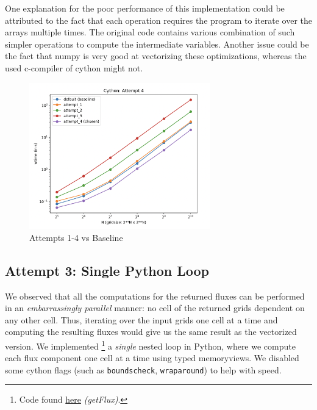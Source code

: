 \documentclass[a4paper,10pt]{article}
\begin{document}
One explanation for the poor performance of this implementation could be attributed to the fact that each operation requires the program to iterate over the arrays multiple times.
The original code contains various combination of such simpler operations to compute the intermediate variables.
Another issue could be the fact that numpy is very good at vectorizing these optimizations, whereas the used c-compiler of cython might not.
\begin{figure}[h]
  \centering
  \includegraphics[width=0.7\textwidth]{images/cython/cython_attempt_4.png}
  \caption{Attempts 1-4 vs Baseline}
  \label{fig:cython_attempts}
\end{figure}

    

\subsection{Attempt 3: Single \textbf{Python} Loop}
We observed that all the computations for the returned fluxes can be performed in an \textit{embarrassingly parallel} manner: no cell of the returned grids dependent on any other cell.
Thus, iterating over the input grids one cell at a time and computing the resulting fluxes would give us the same result as the vectorized version.
We implemented
\footnote{Code found \href{https://github.com/paulmyr/DD2358-HPC25/blob/master/10_project_rishi_paul/code/cython/finitevolume_cython_lib.pyx\#L287}{here} \textit{(getFlux)}.}
a \emph{single} nested loop in Python, where we compute each flux component one cell at a time using typed memoryviews.
We disabled some cython flags (such as \verb|boundscheck|, \verb|wraparound|) to help with speed.
\end{document}
